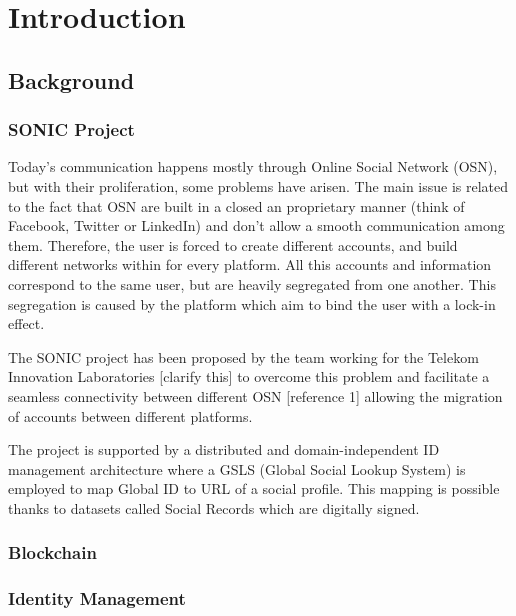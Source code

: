 \chapter{Introduction}
\label{introduction}

\section{Background}
\subsection{SONIC Project}
Today’s communication happens mostly through Online Social Network (OSN), but with their proliferation, some problems have arisen. The main issue is related to the fact that OSN are built in a closed an proprietary manner (think of Facebook, Twitter or LinkedIn) and don’t allow a smooth  communication among them. Therefore, the user is forced to create different accounts, and build different networks within for every platform. All this accounts and information correspond to the same user, but are heavily segregated from one another. This segregation is caused by the platform which aim to bind the user with a lock-in effect. 

The SONIC project has been proposed by the team working for the Telekom Innovation Laboratories [clarify this] to overcome this problem and facilitate a seamless connectivity between different OSN [reference 1] allowing the migration of accounts between different platforms. 

The project is supported by a distributed and domain-independent ID management architecture where a GSLS (Global Social Lookup System) is employed to map Global ID to URL of a social profile. This mapping is possible thanks to datasets called Social Records which are digitally signed. 

\subsection{Blockchain}

\subsection{Identity Management}
